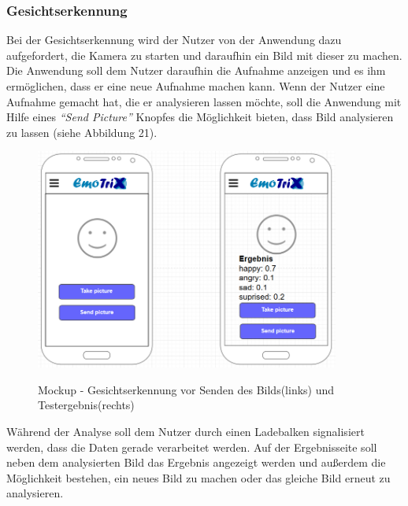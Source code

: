 \subsubsection{Gesichtserkennung}
\label{section:Mockup-Gesichtserkennung}
Bei der Gesichtserkennung wird der Nutzer von der Anwendung dazu aufgefordert, die Kamera zu starten und daraufhin ein Bild mit dieser zu machen. Die Anwendung soll dem Nutzer daraufhin die Aufnahme anzeigen und es ihm ermöglichen, dass er eine neue Aufnahme machen kann. Wenn der Nutzer eine Aufnahme gemacht hat, die er analysieren lassen möchte, soll die Anwendung mit Hilfe eines \textit{``Send Picture''} Knopfes die Möglichkeit bieten, dass Bild analysieren zu lassen (siehe Abbildung 21). \newline
\begin{figure}[h]
	\centering
	\includegraphics[width=10cm]{Bilder/Mockup-Gesichtserkennung.png}
	\label{img:Mockup-Gesichtserkennung}
	\caption[Mockup - Gesichtserkennung vor Senden des Bilds(links) und Testergebnis(rechts)]{Mockup - Gesichtserkennung vor Senden des Bilds(links) und Testergebnis(rechts)}
\end{figure} \newline
Während der Analyse soll dem Nutzer durch einen Ladebalken signalisiert werden, dass die Daten gerade verarbeitet werden. Auf der Ergebnisseite soll neben dem analysierten Bild das Ergebnis angezeigt werden und außerdem die Möglichkeit bestehen, ein neues Bild zu machen oder das gleiche Bild erneut zu analysieren.
